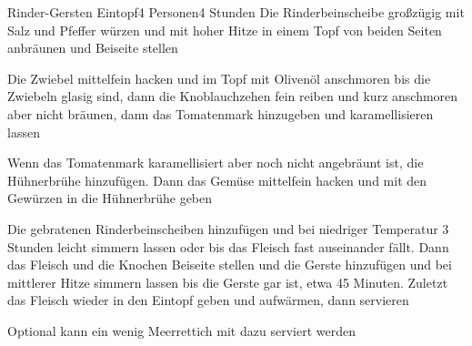 
\begin{recipe}{Rinder-Gersten Eintopf}{4 Personen}{4 Stunden}
Die Rinderbeinscheibe großzügig mit Salz und Pfeffer würzen und mit hoher Hitze in einem Topf von beiden Seiten anbräunen und Beiseite stellen

Die Zwiebel mittelfein hacken und im Topf mit Olivenöl anschmoren bis die Zwiebeln glasig sind, dann die Knoblauchzehen fein reiben und kurz anschmoren aber nicht bräunen, dann das Tomatenmark hinzugeben und karamellisieren lassen

Wenn das Tomatenmark karamellisiert aber noch nicht angebräunt ist, die Hühnerbrühe hinzufügen. Dann das Gemüse mittelfein hacken und mit den Gewürzen in die Hühnerbrühe geben

Die gebratenen Rinderbeinscheiben hinzufügen und bei niedriger Temperatur 3 Stunden leicht simmern lassen oder bis das Fleisch fast auseinander fällt. Dann das Fleisch und die Knochen Beiseite stellen und die Gerste hinzufügen und bei mittlerer Hitze simmern lassen bis die Gerste gar ist, etwa 45 Minuten. Zuletzt das Fleisch wieder in den Eintopf geben und aufwärmen, dann servieren

Optional kann ein wenig Meerrettich mit dazu serviert werden
\end{recipe} 


